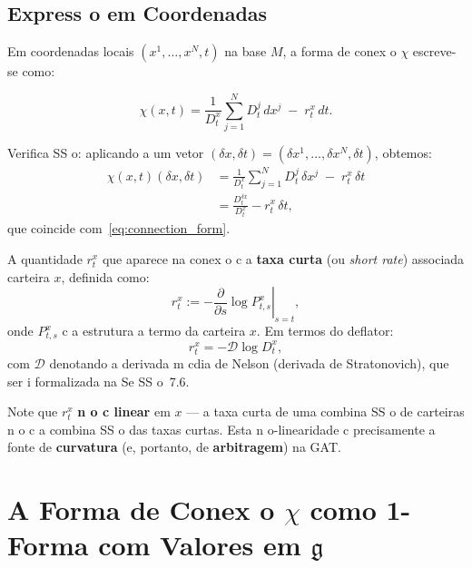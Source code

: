 {\subsection{Express o em Coordenadas}

Em coordenadas locais $(x^1, \dots, x^N, t)$ na base $M$, a forma de
conex o $\chi$ escreve-se como:

\begin{equation}\label{eq:connection_coordinates}
 \chi(x,t) = \frac{1}{D_t^x}\sum_{j=1}^N D_t^j\,dx^j \;-\; r_t^x\,dt.
\end{equation}

Verifica SS o: aplicando a um vetor $(\delta x, \delta t) = (\delta x^1,
\dots, \delta x^N, \delta t)$, obtemos:
\begin{align*}
 \chi(x,t)(\delta x, \delta t)
 &= \frac{1}{D_t^x}\sum_{j=1}^N D_t^j\,\delta x^j \;-\; r_t^x\,\delta t \\
 &= \frac{D_t^{\delta x}}{D_t^x} - r_t^x\,\delta t,
\end{align*}
que coincide com~\eqref{eq:connection_form}.

\begin{obs}
A quantidade $r_t^x$ que aparece na conex o c a \textbf{taxa curta}
(ou \textit{short rate}) associada carteira $x$, definida como:
\begin{equation}\label{eq:short_rate_x}
 r_t^x := -\left.\frac{\partial}{\partial s}\log P_{t,s}^x\right|_{s=t},
\end{equation}
onde $P_{t,s}^x$ c a estrutura a termo da carteira $x$. Em termos do
deflator:
\begin{equation}\label{eq:short_rate_deflator}
 r_t^x = -\mathcal{D}\log D_t^x,
\end{equation}
com $\mathcal{D}$ denotando a derivada m cdia de Nelson (derivada de
Stratonovich), que ser i formalizada na Se SS o~7.6.

Note que $r_t^x$ \textbf{n o c linear} em $x$ --- a taxa curta de uma
combina SS o de carteiras n o c a combina SS o das taxas curtas. Esta
n o-linearidade c precisamente a fonte de \textbf{curvatura} (e,
portanto, de \textbf{arbitragem}) na GAT.
\end{obs}

\section{A Forma de Conex o $\chi$ como 1-Forma com Valores em $\mathfrak{g}$}

}

